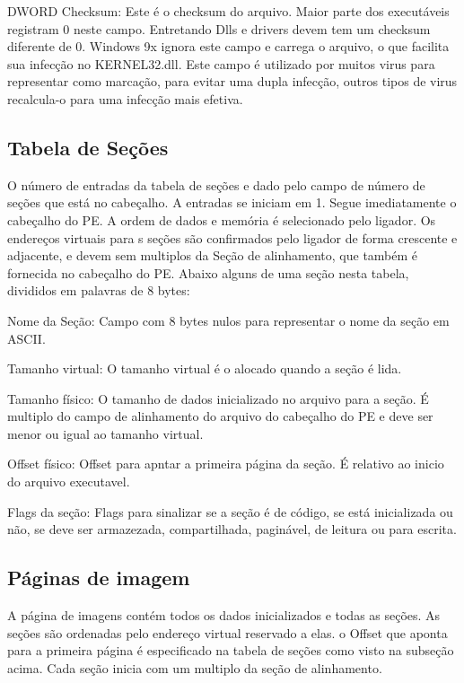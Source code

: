  DWORD Checksum: Este é o checksum do arquivo. Maior parte dos executáveis registram 0 neste campo. Entretando Dlls e drivers devem tem um checksum diferente de 0. 
  Windows 9x ignora este campo e carrega o arquivo, o que facilita sua infecção no KERNEL32.dll. Este campo é utilizado por muitos virus para representar como marcação, para evitar
  uma dupla infecção, outros tipos de virus recalcula-o para uma infecção mais efetiva.

\subsection{Tabela de Seções}


O número de entradas da tabela de seções e dado pelo campo de número
de seções que está no cabeçalho. A entradas se iniciam em 1. Segue
imediatamente o cabeçalho do PE. A ordem de dados e memória é selecionado
pelo ligador. Os endereços virtuais para s seções são confirmados
pelo ligador de forma crescente e adjacente, e devem sem multiplos
da Seção de alinhamento, que também é fornecida no cabeçalho do PE.
Abaixo alguns de uma seção nesta tabela, divididos em palavras de
8 bytes:


Nome da Seção: Campo com 8 bytes nulos para representar o nome da
seção em ASCII.


Tamanho virtual: O tamanho virtual é o alocado quando a seção é lida.


Tamanho físico: O tamanho de dados inicializado no arquivo para a
seção. É multiplo do campo de alinhamento do arquivo do cabeçalho
do PE e deve ser menor ou igual ao tamanho virtual.


Offset físico: Offset para apntar a primeira página da seção. É relativo
ao inicio do arquivo executavel.


Flags da seção: Flags para sinalizar se a seção é de código, se está
inicializada ou não, se deve ser armazezada, compartilhada, paginável,
de leitura ou para escrita.


\subsection{Páginas de imagem}


A página de imagens contém todos os dados inicializados e todas as
seções. As seções são ordenadas pelo endereço virtual reservado a
elas. o Offset que aponta para a primeira página é especificado na
tabela de seções como visto na subseção acima. Cada seção inicia com
um multiplo da seção de alinhamento.


